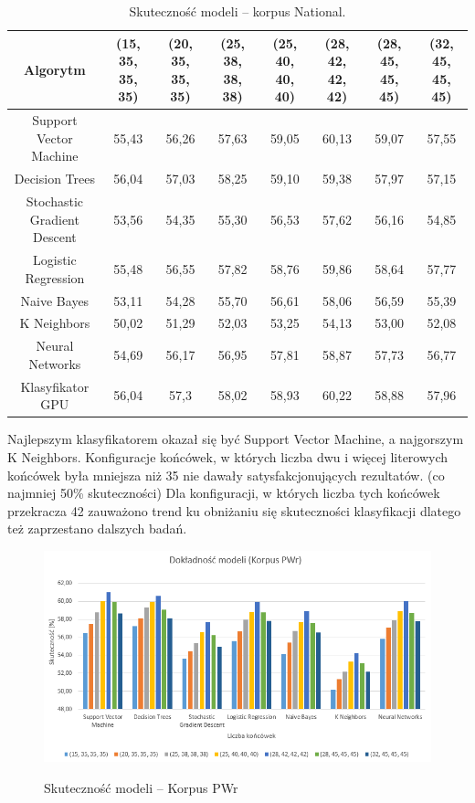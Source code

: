 \begin{landscape}
	\begin{table}[!htbp]
		\centering
		\caption{Skuteczność modeli -- korpus National.}
		\begin{tabular}{cccccccc}
			\toprule
			\textbf{Algorytm} & \textbf{(15, 35, 35, 35)} & \textbf{(20, 35, 35, 35)} & \textbf{(25, 38, 38, 38)} & \textbf{(25, 40, 40, 40)} & \textbf{(28, 42, 42, 42)} & \textbf{(28, 45, 45, 45)} & \textbf{(32, 45, 45, 45)} \\
			\midrule
			Support Vector Machine & 55,43 & 56,26 & 57,63 & 59,05 & 60,13 & 59,07 & 57,55 \\
			Decision Trees & 56,04 & 57,03 & 58,25 & 59,10 & 59,38 & 57,97 & 57,15 \\
			Stochastic Gradient Descent & 53,56 & 54,35 & 55,30 & 56,53 & 57,62 & 56,16 & 54,85 \\
			Logistic Regression & 55,48 & 56,55 & 57,82 & 58,76 & 59,86 & 58,64 & 57,77 \\
			Naive Bayes & 53,11 & 54,28 & 55,70 & 56,61 & 58,06 & 56,59 & 55,39 \\
			K Neighbors & 50,02 & 51,29 & 52,03 & 53,25 & 54,13 & 53,00 & 52,08 \\
			Neural Networks & 54,69 & 56,17 & 56,95 & 57,81 & 58,87 & 57,73 & 56,77 \\
			Klasyfikator GPU & 56,04 & 57,3 & 58,02 & 58,93 & 60,22 & 58,88 & 57,96 \\
			\bottomrule
		\end{tabular}
	\end{table}
\end{landscape}

Najlepszym klasyfikatorem okazał się być Support Vector Machine, a najgorszym K Neighbors. Konfiguracje końcówek, w których liczba dwu i więcej literowych końcówek była mniejsza niż 35 nie dawały satysfakcjonujących rezultatów. (co najmniej 50\% skuteczności) Dla konfiguracji, w których liczba tych końcówek przekracza 42 zauważono trend ku obniżaniu się skuteczności klasyfikacji dlatego też zaprzestano dalszych badań.

\begin{figure}[!htbp]
	\centering
	\includegraphics[width=\linewidth]{korpuspwrwykres}
	\label{Rysunek}
	\caption{Skuteczność modeli -- Korpus PWr}
\end{figure}

